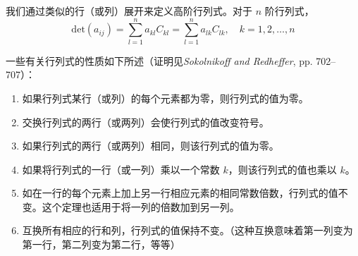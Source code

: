     我们通过类似的行（或列）展开来定义高阶行列式。对于 $n$ 阶行列式，
    \begin{equation}
        \mathrm{det}\left(a_{ij}\right) = \sum_{l=1}^{n} a_{kl}C_{kl} = \sum_{l=1}^{n} a_{lk}C_{lk}, \quad k = 1,2,\ldots,n
        \label{eq:8.29}
    \end{equation}

    一些有关行列式的性质如下所述（证明见\textit{Sokolnikoff and Redheffer}, pp. 702–707）：
        \begin{enumerate}
            \item 如果行列式某行（或列）的每个元素都为零，则行列式的值为零。
            \item 交换行列式的两行（或两列）会使行列式的值改变符号。
            \item 如果行列式的两行（或两列）相同，则该行列式的值为零。
            \item 如果将行列式的一行（或一列）乘以一个常数 $k$，则该行列式的值也乘以 $k$。
            \item 如在一行的每个元素上加上另一行相应元素的相同常数倍数，行列式的值不变。这个定理也适用于将一列的倍数加到另一列。
            \item 互换所有相应的行和列，行列式的值保持不变。（这种互换意味着第一列变为第一行，第二列变为第二行，等等）
        \end{enumerate}
    
